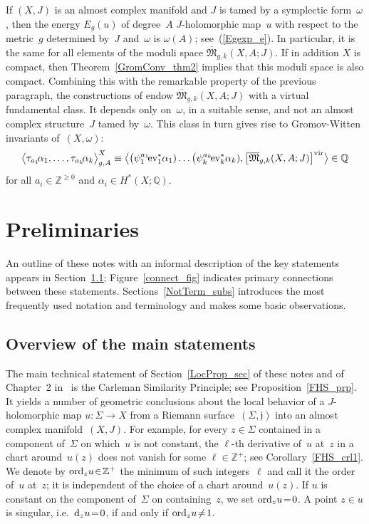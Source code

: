 \documentclass[11pt]{article}
\numberwithin{equation}{section}
\theoremstyle{definition}
\def\eref#1{(\ref{#1})}
\def\ov#1{\overline{#1}}
\def\blr#1{\big\langle#1\big\rangle}
\def\sf#1{\textsf{#1}}
\def\lra{\longrightarrow}
\def\fj{\mathfrak j}
\def\fM{\mathfrak M}
\def\Q{\mathbb Q}
\def\Z{{\mathbb Z}}
\def\al{\alpha}
\def\om{\omega}
\def\Si{\Sigma}
\def\ev{\textnormal{ev}}
\def\nd{\textnormal{d}}
\def\ord{\textnormal{ord}}
\def\vir{\textnormal{vir}}
\begin{document}
\noindent
If $(X,J)$ is an almost complex manifold and $J$ is tamed by a symplectic form~$\om$,
then the energy $E_g(u)$ of degree~$A$ $J$-holomorphic map~$u$ with respect to
the metric~$g$ determined by~$J$ and~$\om$ is $\om(A)$;
see~\eref{Egexp_e}.
In particular, it is the same for all elements of the moduli space $\ov\fM_{g,k}(X,A;J)$.
If in addition $X$ is compact, then Theorem~\ref{GromConv_thm2} implies 
that this moduli space is also compact.
Combining this with the remarkable property of the previous paragraph,
the constructions of \cite{BF,LT0,LT,FO} endow $\ov\fM_{g,k}(X,A;J)$
with a \sf{virtual fundamental class}.
It depends only on~$\om$, in a suitable sense, and not an almost complex structure~$J$
tamed by~$\om$.
This class in turn gives rise to \sf{Gromov-Witten invariants} of~$(X,\om)$:
$$\blr{\tau_{a_1}\!\al_1,\ldots,\tau_{a_k}\!\al_k}_{g,A}^X
\equiv \blr{\big(\psi_1^{a_1}\!\ev_1^*\al_1)\ldots\big(\psi_k^{a_k}\!\ev_k^*\al_k),
\big[\ov\fM_{g,k}(X,A;J)\big]^{\vir}}\in\Q$$
for all $a_i\!\in\!\Z^{\ge0}$  and $\al_i\!\in\!H^*(X;\Q)$.




\section{Preliminaries}
\label{prelim_sec}

\noindent
An outline of these notes with an informal description of the key statements 
appears in Section~\ref{Overview_subs};
Figure~\ref{connect_fig} indicates primary connections between these statements.
Sections~\ref{NotTerm_subs} introduces the most frequently used notation and terminology
and makes some basic observations.


\subsection{Overview of the main statements}
\label{Overview_subs}

\noindent
The main technical statement of Section~\ref{LocProp_sec} of these notes and 
of Chapter~2 in~\cite{MS12}
is the \sf{Carleman Similarity Principle}; see Proposition~\ref{FHS_prp}.
It yields a number of geometric conclusions about the local behavior
of a $J$-holomorphic map $u\!:\Si\!\lra\!X$ from a Riemann surface~$(\Si,\fj)$ into
an almost complex manifold~$(X,J)$.
For example, for every $z\!\in\!\Si$ contained in a component of~$\Si$ on which~$u$ is not constant,
the $\ell$-th derivative of~$u$ at~$z$ in a chart around~$u(z)$ does not vanish for
some $\ell\!\in\!\Z^+$; see Corollary~\ref{FHS_crl1}.
We denote by $\ord_zu\!\in\!\Z^+$ the minimum of such integers~$\ell$ and
call it the \sf{order of~$u$ at~$z$};
it is independent of the choice of a chart around~$u(z)$.
If $u$ is constant on the component of~$\Si$ on containing~$z$, we set $\ord_zu\!=\!0$.
A point $z\!\in\!u$ is \sf{singular}, i.e.~$\nd_zu\!=\!0$, if and only if 
$\ord_zu\!\neq\!1$.\\
\end{document}
